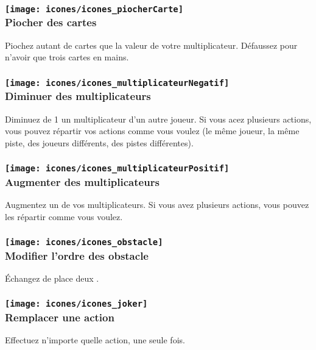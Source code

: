 \subsubsection*{\texttt{[image: icones/icones\_piocherCarte]} \\ Piocher des cartes}
Piochez autant de cartes que la valeur de votre multiplicateur. Défaussez pour n'avoir que trois cartes en mains.

\subsubsection*{\texttt{[image: icones/icones\_multiplicateurNegatif]} \\ Diminuer des multiplicateurs}
Diminuez de 1 un multiplicateur d'un autre joueur. Si vous acez plusieurs actions, vous pouvez répartir vos actions comme vous voulez (le même joueur, la même piste, des joueurs différents, des pistes différentes).

\subsubsection*{\texttt{[image: icones/icones\_multiplicateurPositif]} \\ Augmenter des multiplicateurs}
Augmentez un de vos multiplicateurs. Si vous avez plusieurs actions, vous pouvez les répartir comme vous voulez.

\subsubsection*{\texttt{[image: icones/icones\_obstacle]} \\ Modifier l'ordre des obstacle}
Échangez de place deux \marqueursObstacles.

\subsubsection*{\texttt{[image: icones/icones\_joker]} \\ Remplacer une action}
Effectuez n'importe quelle action, une seule fois.